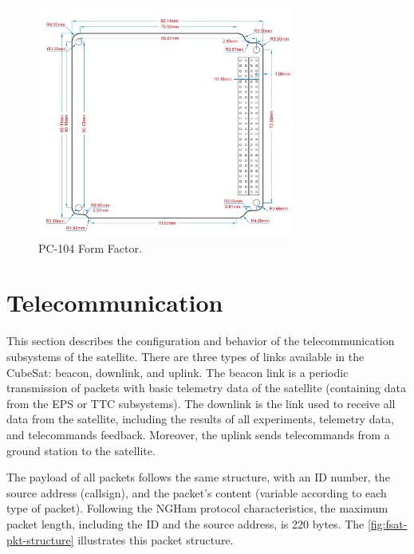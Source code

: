 \begin{figure}[!htb]
    \begin{center}
        \includegraphics[width=0.75\textwidth]{figures/pc104-form-factor.pdf}
        \caption{PC-104 Form Factor.}
        \label{fig:pc104-form-factor}
    \end{center}
\end{figure}

\section{Telecommunication}

This section describes the configuration and behavior of the telecommunication subsystems of the satellite. There are three types of links available in the CubeSat: beacon, downlink, and uplink. The beacon link is a periodic transmission of packets with basic telemetry data of the satellite (containing data from the EPS or TTC subsystems). The downlink is the link used to receive all data from the satellite, including the results of all experiments, telemetry data, and telecommands feedback. Moreover, the uplink sends telecommands from a ground station to the satellite.

The payload of all packets follows the same structure, with an ID number, the source address (callsign), and the packet's content (variable according to each type of packet). Following the NGHam protocol characteristics, the maximum packet length, including the ID and the source address, is 220 bytes. The \autoref{fig:fsat-pkt-structure} illustrates this packet structure.

